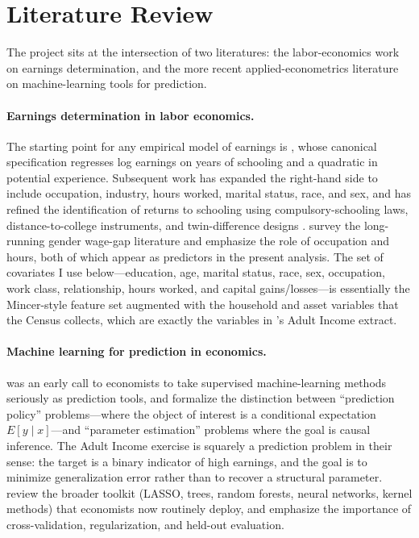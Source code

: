 \documentclass[12pt,english]{article}
\begin{document}
\section{Literature Review}\label{sec:litreview}

The project sits at the intersection of two literatures: the labor-economics
work on earnings determination, and the more recent applied-econometrics
literature on machine-learning tools for prediction.

\paragraph{Earnings determination in labor economics.}
The starting point for any empirical model of earnings is
\citet{mincer1974}, whose canonical specification regresses log earnings
on years of schooling and a quadratic in potential experience. Subsequent
work has expanded the right-hand side to include occupation, industry,
hours worked, marital status, race, and sex, and has refined the
identification of returns to schooling using compulsory-schooling laws,
distance-to-college instruments, and twin-difference designs
\citep{card1999}. \citet{blau2017} survey the long-running gender wage-gap
literature and emphasize the role of occupation and hours, both of which
appear as predictors in the present analysis. The set of covariates I use
below---education, age, marital status, race, sex, occupation, work class,
relationship, hours worked, and capital gains/losses---is essentially the
Mincer-style feature set augmented with the household and asset variables
that the Census collects, which are exactly the variables in
\citet{kohavi1996}'s Adult Income extract.

\paragraph{Machine learning for prediction in economics.}
\citet{varian2014} was an early call to economists to take supervised
machine-learning methods seriously as prediction tools, and
\citet{mullainathanSpiess2017} formalize the distinction between
``prediction policy'' problems---where the object of interest is a
conditional expectation $E[y \mid x]$---and ``parameter estimation''
problems where the goal is causal inference. The Adult Income exercise is
squarely a prediction problem in their sense: the target is a binary
indicator of high earnings, and the goal is to minimize generalization
error rather than to recover a structural parameter. \citet{athey2019}
review the broader toolkit (LASSO, trees, random forests, neural networks,
kernel methods) that economists now routinely deploy, and emphasize the
importance of cross-validation, regularization, and held-out evaluation.
\end{document}
